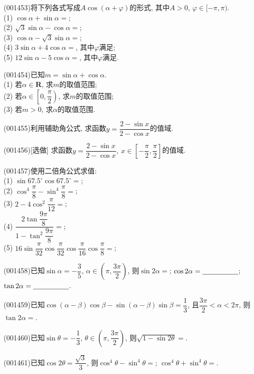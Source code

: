 \item (001453)将下列各式写成$A\cos(\alpha+\varphi)$的形式, 其中$A>0$, $\varphi\in [-\pi,\pi)$.\\ 
(1) $\cos\alpha+\sin\alpha=$;\\ 
(2) $\sqrt{3}\sin\alpha-\cos\alpha=$;\\ 
(3) $\cos\alpha-\sqrt{3}\sin\alpha=$;\\ 
(4) $3\sin\alpha+4\cos\alpha=$, 其中$\varphi$满足;\\ 
(5) $12\sin\alpha-5\cos\alpha=$, 其中$\varphi$满足.
\item (001454)已知$m=\sin\alpha+\cos\alpha$.\\ 
(1) 若$\alpha\in \mathbf{R}$, 求$m$的取值范围;\\ 
(2) 若$\alpha \in \left[0,\dfrac{\pi}{2}\right)$, 求$m$的取值范围;\\ 
(3) 若$m>0$, 求$\alpha$的取值范围.
\item (001455)利用辅助角公式, 求函数$y=\dfrac{2-\sin x}{2-\cos x}$的值域.
\item (001456)[选做]
求函数$y=\dfrac{2-\sin x}{2-\cos x}, \ x \in \left[-\dfrac{\pi}2,\dfrac{\pi}2\right]$的值域.
\item (001457)使用二倍角公式求值:\\ 
(1) $\sin 67.5^\circ\cos 67.5^\circ=$;\\ 
(2) $\cos^4\dfrac{\pi}{8}-\sin^4\dfrac{\pi}{8}=$;\\ 
(3) $2-4\cos^2\dfrac{\pi}{12}=$;\\ 
(4) $\dfrac{2\tan \dfrac{9\pi}{8}}{1-\tan^2\dfrac{9\pi}{8}}=$;\\ 
(5) $16\sin\dfrac{\pi}{32}\cos\dfrac{\pi}{32}\cos\dfrac{\pi}{16}\cos\dfrac{\pi}{8}=$;
\item (001458)已知$\sin\alpha=-\dfrac{3}{5}$, $\alpha\in \left(\pi,\dfrac{3\pi}{2}\right)$, 则$\sin 2\alpha=$; $\cos 2\alpha=\blank{50}$; $\tan 2\alpha=\blank{50}$.
\item (001459)已知$\cos(\alpha-\beta)\cos\beta-\sin(\alpha-\beta)\sin\beta=\dfrac{1}{3}$, 且$\dfrac{3\pi}{2}<\alpha<2\pi$, 则$\tan 2\alpha=$.
\item (001460)已知$\sin\theta=-\dfrac{1}{3}$, $\theta\in \left(\pi, \dfrac{3\pi}{2}\right)$, 则$\sqrt{1-\sin 2\theta}=$.
\item (001461)已知$\cos 2\theta=\dfrac{\sqrt{3}}{3}$, 则$\cos^4\theta-\sin^4\theta=$; $\cos^4\theta+\sin^4\theta=$.
